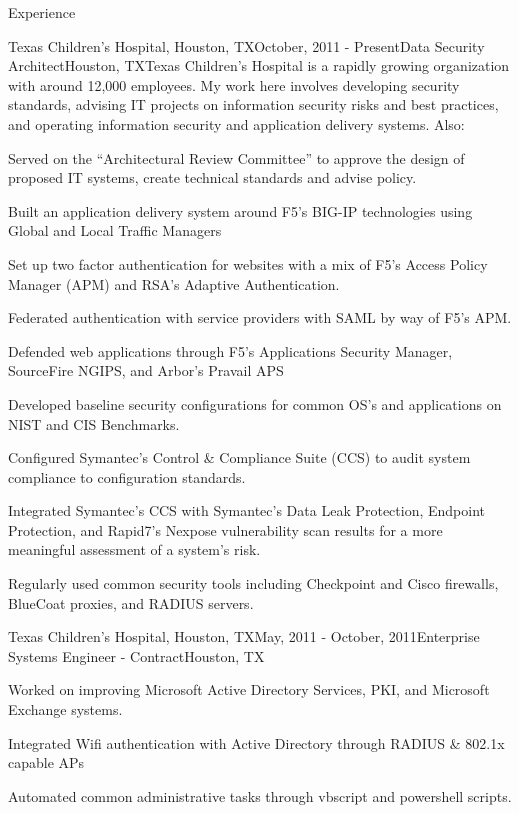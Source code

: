 \documentclass{resume} %
\begin{document}

\begin{rSection}{Experience}

\begin{rSubsection}{Texas Children's Hospital, Houston, TX}{October, 2011 - Present}{Data Security Architect}{Houston, TX}{Texas Children's Hospital is a rapidly growing organization with around 12,000 employees. My work here involves developing security standards, advising IT projects on information security risks and best practices, and operating information security and application delivery systems. Also:}
\item Served on the ``Architectural Review Committee'' to approve the design of proposed IT systems, create technical standards and advise policy.
\item Built an application delivery system around F5's BIG-IP technologies using Global and Local Traffic Managers
\item Set up two factor authentication for websites with a mix of  F5's Access Policy Manager (APM) and RSA's Adaptive Authentication.
\item Federated authentication with service providers with SAML by way of F5's APM.
\item Defended web applications through F5's Applications Security Manager, SourceFire NGIPS, and Arbor's Pravail APS
\item Developed baseline security configurations for common OS’s and applications on NIST and CIS Benchmarks.
\item Configured Symantec's Control \& Compliance Suite (CCS) to audit system compliance to configuration standards.
\item Integrated Symantec's CCS with Symantec’s Data Leak Protection, Endpoint Protection, and Rapid7’s Nexpose vulnerability scan results for a more meaningful assessment of a system's risk.
\item Regularly used common security tools including Checkpoint and Cisco firewalls, BlueCoat proxies, and RADIUS servers.
\end{rSubsection}
\begin{rSubsection}{Texas Children's Hospital, Houston, TX}{May, 2011 - October, 2011}{Enterprise Systems Engineer - Contract}{Houston, TX}{}
\item Worked on improving Microsoft Active Directory Services, PKI, and Microsoft Exchange systems.
\item Integrated Wifi authentication with Active Directory through RADIUS \& 802.1x capable APs
\item Automated common administrative tasks through vbscript and powershell scripts.
\end{rSubsection}


\end{rSection}
\end{document}
